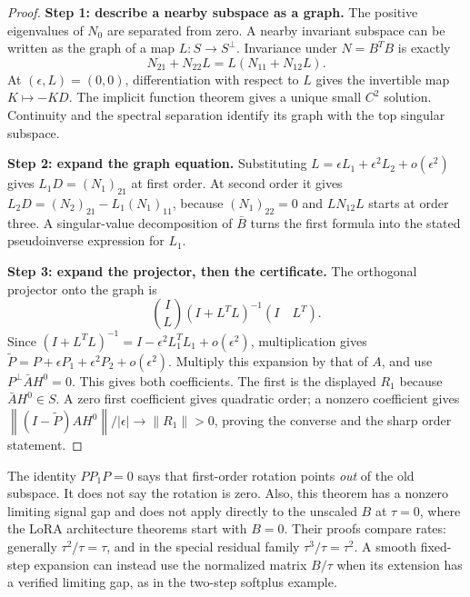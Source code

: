\documentclass[12pt,a4paper]{article}
\theoremstyle{readable}
\theoremstyle{definition}\newtheorem{example}[theorem]{Example}
\newcommand{\norm}[1]{\left\|#1\right\|}
\begin{document}
\begin{proof}
\textbf{Step 1: describe a nearby subspace as a graph.} The positive eigenvalues of \(N_0\) are separated from zero. A nearby invariant subspace can be written as the graph of a map \(L:S\to S^\perp\). Invariance under \(N=B^TB\) is exactly
\[
N_{21}+N_{22}L=L(N_{11}+N_{12}L).
\]
At \((\epsilon,L)=(0,0)\), differentiation with respect to \(L\) gives the invertible map \(K\mapsto-KD\). The implicit function theorem gives a unique small \(C^2\) solution. Continuity and the spectral separation identify its graph with the top singular subspace.

\textbf{Step 2: expand the graph equation.} Substituting \(L=\epsilon L_1+\epsilon^2L_2+o(\epsilon^2)\) gives
\(L_1D=(N_1)_{21}\) at first order. At second order it gives
\(L_2D=(N_2)_{21}-L_1(N_1)_{11}\), because \((N_1)_{22}=0\) and \(LN_{12}L\) starts at order three. A singular-value decomposition of \(\bar B\) turns the first formula into the stated pseudoinverse expression for \(L_1\).

\textbf{Step 3: expand the projector, then the certificate.} The orthogonal projector onto the graph is
\[
\binom{I}{L}(I+L^TL)^{-1}(I\quad L^T).
\]
Since \((I+L^TL)^{-1}=I-\epsilon^2L_1^TL_1+o(\epsilon^2)\), multiplication gives
\(\widetilde P=P+\epsilon P_1+\epsilon^2P_2+o(\epsilon^2)\).
Multiply this expansion by that of \(A\), and use \(P^\perp\bar A H^0=0\). This gives both coefficients. The first is the displayed \(R_1\) because \(\bar A H^0\in S\). A zero first coefficient gives quadratic order; a nonzero coefficient gives
\(\norm{(I-\widetilde P)AH^0}/|\epsilon|\to\norm{R_1}>0\), proving the converse and the sharp order statement.
\end{proof}
The identity \(PP_1P=0\) says that first-order rotation points \emph{out} of the old subspace. It does not say the rotation is zero. Also, this theorem has a nonzero limiting signal gap and does not apply directly to the unscaled \(B\) at \(\tau=0\), where the LoRA architecture theorems start with \(B=0\). Their proofs compare rates: generally \(\tau^2/\tau=\tau\), and in the special residual family \(\tau^3/\tau=\tau^2\). A smooth fixed-step expansion can instead use the normalized matrix \(B/\tau\) when its extension has a verified limiting gap, as in the two-step softplus example.
\end{document}
